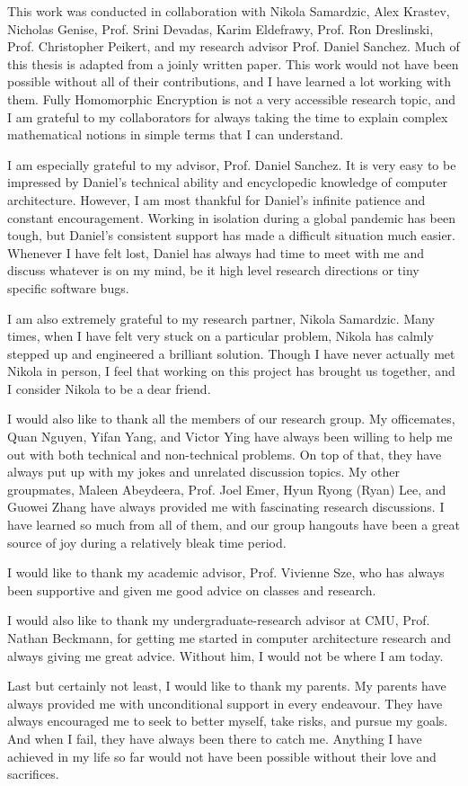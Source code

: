 This work was conducted in collaboration with Nikola Samardzic, Alex Krastev, Nicholas Genise, Prof. Srini Devadas, Karim Eldefrawy, Prof. Ron Dreslinski, Prof. Christopher Peikert, and my research advisor Prof. Daniel Sanchez. Much of this thesis is adapted from a joinly written paper. This work would not have been possible without all of their contributions, and I have learned a lot working with them. Fully Homomorphic Encryption is not a very accessible research topic, and I am grateful to my collaborators for always taking the time to explain complex mathematical notions in simple terms that I can understand.

I am especially grateful to my advisor, Prof. Daniel Sanchez. It is very easy to be impressed by Daniel's technical ability and encyclopedic knowledge of computer architecture. However, I am most thankful for Daniel's infinite patience and constant encouragement. Working in isolation during a global pandemic has been tough, but Daniel's consistent support has made a difficult situation much easier. Whenever I have felt lost, Daniel has always had time to meet with me and discuss whatever is on my mind, be it high level research directions or tiny specific software bugs.

I am also extremely grateful to my research partner, Nikola Samardzic. Many times, when I have felt very stuck on a particular problem, Nikola has calmly stepped up and engineered a brilliant solution. Though I have never actually met Nikola in person, I feel that working on this project has brought us together, and I consider Nikola to be a dear friend.

I would also like to thank all the members of our research group. My officemates, Quan Nguyen, Yifan Yang, and Victor Ying have always been willing to help me out with both technical and non-technical problems. On top of that, they have always put up with my jokes and unrelated discussion topics. My other groupmates, Maleen Abeydeera, Prof. Joel Emer, Hyun Ryong (Ryan) Lee, and Guowei Zhang have always provided me with fascinating research discussions. I have learned so much from all of them, and our group hangouts have been a great source of joy during a relatively bleak time period.

I would like to thank my academic advisor, Prof. Vivienne Sze, who has always been supportive and given me good advice on classes and research. 

I would also like to thank my undergraduate-research advisor at CMU, Prof. Nathan Beckmann, for getting me started in computer architecture research and always giving me great advice. Without him, I would not be where I am today.

Last but certainly not least, I would like to thank my parents. My parents have always provided me with unconditional support in every endeavour. They have always encouraged me to seek to better myself, take risks, and pursue my goals. And when I fail, they have always been there to catch me. Anything I have achieved in my life so far would not have been possible without their love and sacrifices.